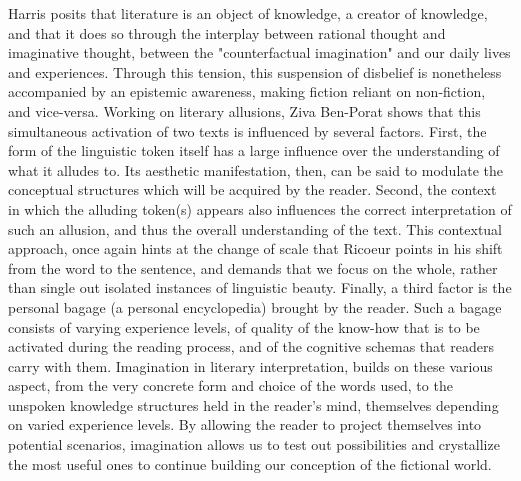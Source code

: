\documentclass{article}
\begin{document}
Harris posits that literature is an object of knowledge, a creator of knowledge, and that it does so through the interplay between rational thought and imaginative thought, between the "counterfactual imagination" and our daily lives and experiences. Through this tension, this suspension of disbelief is nonetheless accompanied by an epistemic awareness, making fiction reliant on non-fiction, and vice-versa. Working on literary allusions, Ziva Ben-Porat shows that this simultaneous activation of two texts is influenced by several factors. First, the form of the linguistic token itself has a large influence over the understanding of what it alludes to. Its aesthetic manifestation, then, can be said to modulate the conceptual structures which will be acquired by the reader. Second, the context in which the alluding token(s) appears also influences the correct interpretation of such an allusion, and thus the overall understanding of the text. This contextual approach, once again hints at the change of scale that Ricoeur points in his shift from the word to the sentence, and demands that we focus on the whole, rather than single out isolated instances of linguistic beauty. Finally, a third factor is the personal bagage (a personal encyclopedia) brought by the reader. Such a bagage consists of varying experience levels, of quality of the know-how that is to be activated during the reading process, and of the cognitive schemas that readers carry with them. Imagination in literary interpretation, builds on these various aspect, from the very concrete form and choice of the words used, to the unspoken knowledge structures held in the reader's mind, themselves depending on varied experience levels. By allowing the reader to project themselves into potential scenarios, imagination allows us to test out possibilities and crystallize the most useful ones to continue building our conception of the fictional world.
\end{document}
